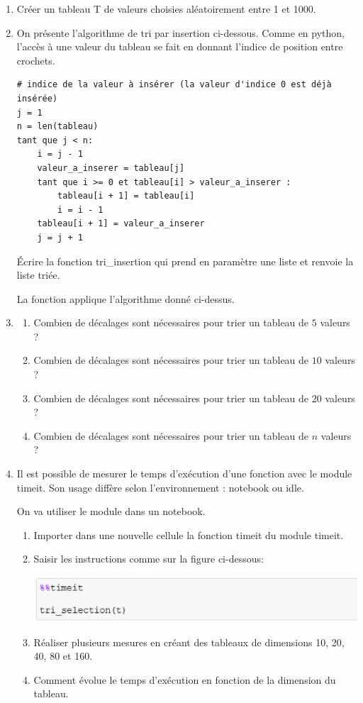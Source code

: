 \documentclass[11pt,a4paper]{article}
\begin{document}
\begin{enumerate}
\item Créer un tableau T de valeurs choisies aléatoirement entre 1 et 1000.
\item On présente l'algorithme de tri par insertion ci-dessous. Comme en python, l'accès à une valeur du tableau se fait en donnant l'indice de position entre crochets.

\begin{lstlisting}
# indice de la valeur à insérer (la valeur d'indice 0 est déjà insérée)
j = 1
n = len(tableau)
tant que j < n:
	i = j - 1
	valeur_a_inserer = tableau[j]
	tant que i >= 0 et tableau[i] > valeur_a_inserer :
		tableau[i + 1] = tableau[i]
		i = i - 1
	tableau[i + 1] = valeur_a_inserer
	j = j + 1
\end{lstlisting}

Écrire la fonction \textsf{tri\_insertion} qui prend en paramètre une liste et renvoie la liste triée.

La fonction applique l'algorithme donné ci-dessus.


\item \begin{enumerate}
\item Combien de décalages sont nécessaires pour trier un tableau de $5$ valeurs ?
\item Combien de décalages sont nécessaires pour trier un tableau de $10$ valeurs ?
\item Combien de décalages sont nécessaires pour trier un tableau de $20$ valeurs ?
\item Combien de décalages sont nécessaires pour trier un tableau de $n$ valeurs ?
\end{enumerate}

\item Il est possible de mesurer le temps d'exécution d'une fonction avec le module \textsf{timeit}. Son usage diffère selon l'environnement : notebook ou idle.

On va utiliser le module dans un notebook.

\begin{enumerate}
\item Importer dans une nouvelle cellule la fonction \textsf{timeit} du module \textsf{timeit}.
\item Saisir les instructions comme sur la figure ci-dessous:

\includegraphics[scale=0.8]{img/timeit.eps}

\item Réaliser plusieurs mesures en créant des tableaux de dimensions \textsf{10}, \textsf{20}, \textsf{40}, \textsf{80} et \textsf{160}.

\item Comment évolue le temps d'exécution en fonction de la dimension du tableau.
\end{enumerate}
\end{enumerate}
\end{document}
